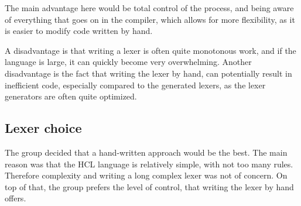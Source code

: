 The main advantage here would be total control of the process, and being aware of everything that goes on in the compiler, which allows for more flexibility, as it is easier to modify code written by hand.

A disadvantage is that writing a lexer is often quite monotonous work, and if the language is large, it can quickly become very overwhelming.
Another disadvantage is the fact that writing the lexer by hand, can potentially result in inefficient code, especially compared to the generated lexers, as the lexer generators are often quite optimized.

\subsection{Lexer choice}
\label{LexerChoice}
The group decided that a hand-written approach would be the best.
The main reason was that the HCL language is relatively simple, with not too many rules.
Therefore complexity and writing a long complex lexer was not of concern.
On top of that, the group prefers the level of control, that writing the lexer by hand offers.


